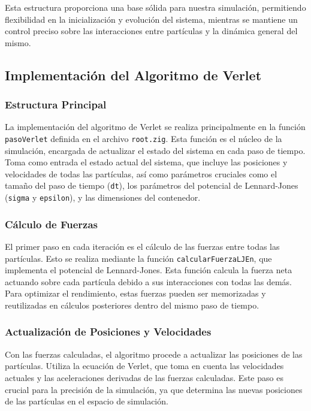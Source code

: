 \documentclass[twocolumn]{article}
\begin{document}
Esta estructura proporciona una base sólida para nuestra simulación, permitiendo flexibilidad en la inicialización y evolución del sistema, mientras se mantiene un control preciso sobre las interacciones entre partículas y la dinámica general del mismo.

\subsection*{Implementación del Algoritmo de Verlet}

\subsubsection*{Estructura Principal}

La implementación del algoritmo de Verlet se realiza principalmente en la función \texttt{pasoVerlet} definida en el archivo \texttt{root.zig}. Esta función es el núcleo de la simulación, encargada de actualizar el estado del sistema en cada paso de tiempo. Toma como entrada el estado actual del sistema, que incluye las posiciones y velocidades de todas las partículas, así como parámetros cruciales como el tamaño del paso de tiempo (\texttt{dt}), los parámetros del potencial de Lennard-Jones (\texttt{sigma} y \texttt{epsilon}), y las dimensiones del contenedor.

\subsubsection*{Cálculo de Fuerzas}

El primer paso en cada iteración es el cálculo de las fuerzas entre todas las partículas. Esto se realiza mediante la función \texttt{calcularFuerzaLJEn}, que implementa el potencial de Lennard-Jones. Esta función calcula la fuerza neta actuando sobre cada partícula debido a sus interacciones con todas las demás. Para optimizar el rendimiento, estas fuerzas pueden ser memorizadas y reutilizadas en cálculos posteriores dentro del mismo paso de tiempo.

\subsubsection*{Actualización de Posiciones y Velocidades}

Con las fuerzas calculadas, el algoritmo procede a actualizar las posiciones de las partículas. Utiliza la ecuación de Verlet, que toma en cuenta las velocidades actuales y las aceleraciones derivadas de las fuerzas calculadas. Este paso es crucial para la precisión de la simulación, ya que determina las nuevas posiciones de las partículas en el espacio de simulación.
\end{document}
